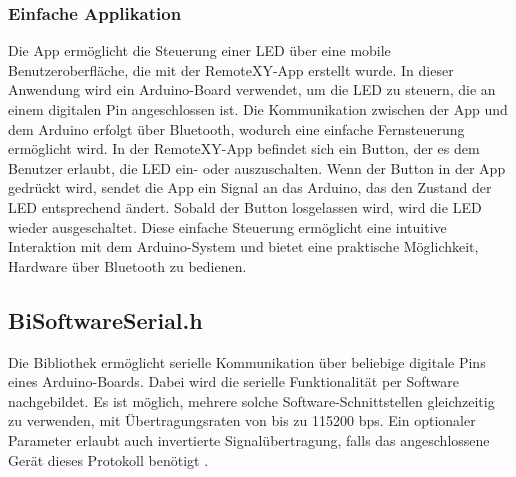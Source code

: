 {
}

\subsubsection{Einfache Applikation}
Die App  ermöglicht die Steuerung einer LED über eine mobile Benutzeroberfläche, die mit der RemoteXY-App erstellt wurde. In dieser Anwendung wird ein Arduino-Board verwendet, um die LED zu steuern, die an einem digitalen Pin angeschlossen ist. Die Kommunikation zwischen der App und dem Arduino erfolgt über Bluetooth, wodurch eine einfache Fernsteuerung ermöglicht wird. In der RemoteXY-App befindet sich ein Button, der es dem Benutzer erlaubt, die LED ein- oder auszuschalten. Wenn der Button in der App gedrückt wird, sendet die App ein Signal an das Arduino, das den Zustand der LED entsprechend ändert. Sobald der Button losgelassen wird, wird die LED wieder ausgeschaltet. Diese einfache Steuerung ermöglicht eine intuitive Interaktion mit dem Arduino-System und bietet eine praktische Möglichkeit, Hardware über Bluetooth zu bedienen.

{
}

\subsection{BiSoftwareSerial.h}
\label{SoftwareSerialBibliothek}
Die  Bibliothek ermöglicht serielle Kommunikation über beliebige digitale Pins eines Arduino-Boards. Dabei wird die serielle Funktionalität per Software nachgebildet. Es ist möglich, mehrere solche Software-Schnittstellen gleichzeitig zu verwenden, mit Übertragungsraten von bis zu 115200 bps. Ein optionaler Parameter erlaubt auch invertierte Signalübertragung, falls das angeschlossene Gerät dieses Protokoll benötigt \cite{Arduino:2022}.



